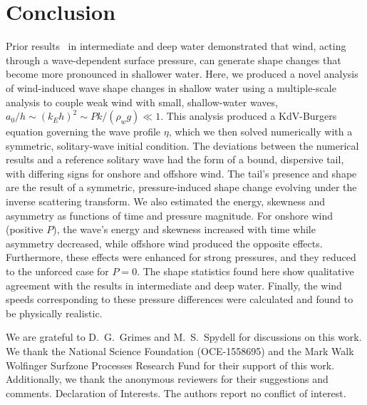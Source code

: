 \documentclass{jfm}
\begin{document}
\section{\label{sec:conclusion} Conclusion}
Prior results~\citep{zdyrski2020wind} in intermediate and deep water
demonstrated that wind,
acting through a wave-dependent surface pressure,
can generate shape changes that become more pronounced in
shallower water.
Here, we produced a novel analysis of wind-induced wave shape changes in
shallow water using a multiple-scale analysis to couple weak wind with
small, shallow-water waves, \ie{} $a_0/h \sim (k_E h)^2 \sim P k/(\rho_w
g) \ll 1$.
This analysis produced a KdV-Burgers equation governing the wave profile
$\eta$, which we then solved numerically with a symmetric, solitary-wave
initial condition.
The deviations between the numerical results and a reference solitary
wave had the form of a bound, dispersive tail, with differing signs for
onshore and offshore wind.
The tail's presence and shape are the result of a symmetric,
pressure-induced shape change evolving under the inverse scattering
transform.
We also estimated the energy, skewness and
asymmetry as functions of time and pressure magnitude.
For onshore wind (positive $P$), the wave's energy and skewness
increased with time while asymmetry decreased, while offshore wind
produced the opposite effects.
Furthermore, these effects were enhanced for strong pressures, and they
reduced to the unforced case for $P=0$.
The shape statistics found here show qualitative agreement with the
results in intermediate and deep water.
Finally, the wind speeds corresponding to these pressure differences
were calculated and found to be physically realistic.

\begin{acknowledgements}
We are grateful to D.~G.~Grimes and M.~S.~Spydell for discussions on
this work.
We thank the National Science Foundation (OCE-1558695) and the Mark Walk
Wolfinger Surfzone Processes Research Fund for their support of this
work.
Additionally, we thank the anonymous reviewers for their suggestions and
comments.
Declaration of Interests. The authors report no conflict of interest.
\end{acknowledgements}



\end{document}
